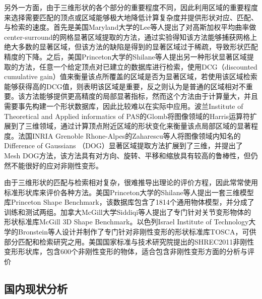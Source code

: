 \documentclass[twoside,UTF8]{nputhesis}
\begin{document}
另外一方面，由于三维形状的各个部分的重要程度不同，因此利用区域的重要程度来选择需要匹配的顶点或区域能够极大地降低计算复杂度并提供形状对应、匹配、与检索的速度。首先是美国Maryland大学的Lee等人\cite{Lee2005Mesh}提出了对高斯加权平均曲率做center-surround的网格显著区域提取的方法，通过实验得知该方法能够捕获网格上绝大多数的显著区域，但该方法的缺陷是得到的显著区域过于稀疏，导致形状匹配精度的下降。之后，美国Princeton大学的Shilane等人\cite{Shilane2007Distinctive}提出另一种形状显著区域提取的方法，任意一个给定顶点对已建立的数据库进行检索，使用DCG（discounted cumulative gain）值来衡量该点所覆盖的区域是否为显著区域，若使用该区域检索能够获得高的DCG值，则表明该区域是重要，反之则认为是普通的区域相对不重要。该方法能够提供更高精度的局部显著指标，然而这个方法由于计算量大，并且需要事先构建一个形状数据库，因此比较难以在实际中应用。波兰Institute of Theoretical and Applied informatics of PAS的Glomb\cite{G2009Detection}将图像领域的Harris运算符扩展到了三维领域，通过计算顶点附近区域的形状变化来衡量该点局部区域的显著程度。法国INRIA Grenoble Rhone-Alpes的Zaharescu等人\cite{Zaharescu2009Surface}将图像领域内知名的Difference of Gaussians （DOG）显著区域提取方法扩展到了三维，并提出了Mesh DOG方法，该方法具有对方向、旋转、平移和缩放具有较高的鲁棒性，但仍然不能很好的应对非刚性变形。

由于三维形状的匹配与检索相对复杂，很难推导出理论的评价方程，因此常常使用标准形状库来评价各种方法。美国Princeton大学的Shilane等人\cite{Shilane2004The}提出一套三维模型库Princeton Shape Benchmark，该数据库包含了1814个通用物体模型，并分成了训练和测试两组。加拿大McGill大学Siddiqi等人\cite{Siddiqi2008Retrieving}提出了专门针对关节变形物体的形状标准库McGill 3D Shape Benchmark。以色列Israel Institute of Technology大学的Bronstein等人\cite{Bronstein2009Numerical}设计并制作了专门针对非刚性变形的形状标准库TOSCA，可供部分匹配和检索研究之用。美国国家标准与技术研究院提出的SHREC2011非刚性变形形状库\cite{Lian2011SHREC}，包含600个非刚性变形的物体，适合包含非刚性变形方面的分析与评价

\subsection{国内现状分析}
\end{document}
